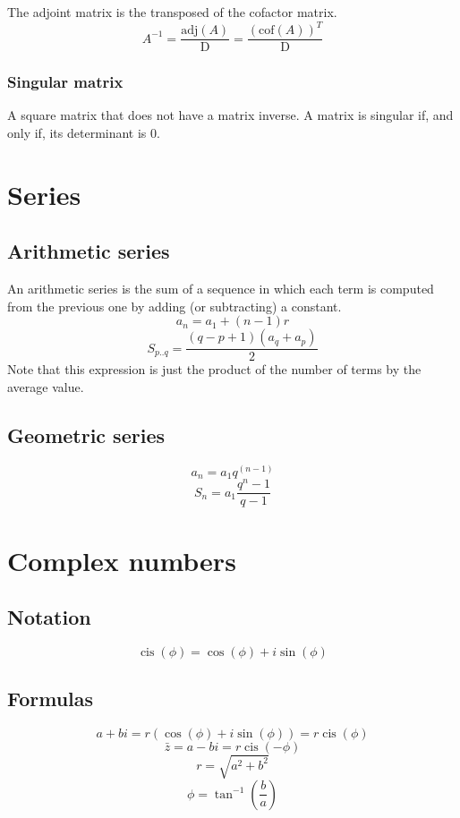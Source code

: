 \documentclass[12pt, oneside]{book}
\DeclareMathOperator\cis{cis}
\newcommand*\conj[1]{\bar{#1}}
\newcommand*\argument{\phi}
\begin{document}
The adjoint matrix is the transposed of the cofactor matrix.
\[A^{-1} = \frac{\mathrm{adj}(A)}{\mathrm{D}} =
\frac{(\mathrm{cof}(A))^{T}}{\mathrm{D}}\]

\subsection{Singular matrix}
A square matrix that does not have a matrix inverse. A matrix is singular if,
and only if, its determinant is 0.


\chapter{Series}

\section{Arithmetic series}
An arithmetic series is the sum of a sequence in which each term is computed
from the previous one by adding (or subtracting) a constant.
\[a_n = a_1 + (n-1)r\]
\[S_{p..q} = \frac{(q - p + 1)(a_q + a_p)}{2}\]
Note that this expression is just the product of the number of terms by the
average value.

\section{Geometric series}
\[a_n = a_1 q^{(n-1)}\]
\[S_n = a_1 \frac{q^n - 1}{q-1}\]

\chapter{Complex numbers}

\section{Notation}
\[\cis \left ( \argument \right ) =  \cos \left ( \argument \right ) + i \sin
\left ( \argument \right )\]

\section{Formulas}
\[a + bi = r \left( \cos \left ( \argument \right ) + i \sin \left ( \argument
\right ) \right )
= r \cis \left ( \argument \right )\]
\[\conj{z} = a - bi = r \cis \left (- \argument \right)\]
\[r = \sqrt{a^2 + b^2}\]
\[\phi = \tan^{-1} \left ( \frac{b}{a} \right)\]
\end{document}
